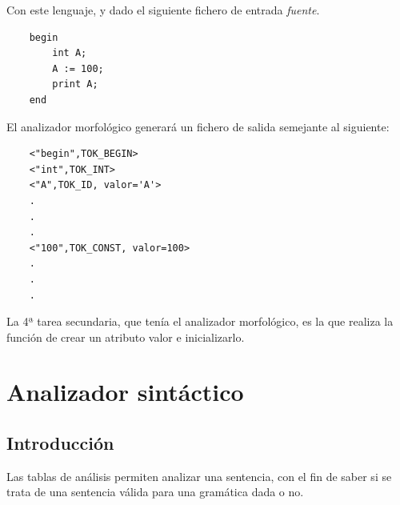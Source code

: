 \documentclass{apuntes}
\begin{document}
Con este lenguaje, y dado el siguiente fichero de entrada  \textit{fuente}.

\begin{verbatim}
    begin
        int A;
        A := 100;
        print A;
    end
\end{verbatim}

El analizador morfológico generará un fichero de salida semejante al siguiente:

\begin{verbatim}
    <"begin",TOK_BEGIN>
    <"int",TOK_INT>
    <"A",TOK_ID, valor='A'>
    .
    .
    .
    <"100",TOK_CONST, valor=100>
    .
    .
    .
\end{verbatim}

La 4ª tarea secundaria, que tenía el analizador morfológico, es la que realiza la función de crear un atributo valor e inicializarlo.

\chapter{Analizador sintáctico}

\section{Introducción}

Las tablas de análisis permiten analizar una sentencia, con el fin de saber si se trata de una sentencia válida para una gramática dada o no.
\end{document}
